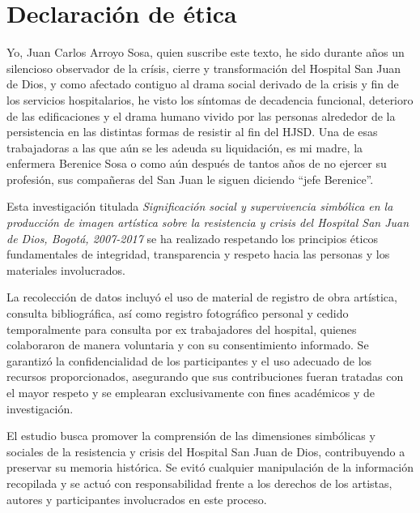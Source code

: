 \section*{Declaración de ética}
\setlength{\parskip}{1em}

\textcolor{edit30sept}{Yo, Juan Carlos Arroyo Sosa, quien suscribe este texto,} he sido durante años un silencioso observador \textcolor{edit30sept}{de la crísis, cierre y transformación del Hospital San Juan de Dios}, y como afectado contiguo al drama social derivado de la crisis y fin de los servicios hospitalarios, he visto los síntomas de decadencia funcional, deterioro de las edificaciones y el drama humano vivido por las personas alrededor de la persistencia en las distintas formas de resistir al fin del HJSD. Una de esas trabajadoras a las que aún se les adeuda su liquidación, es mi madre, la enfermera Berenice Sosa o como aún después de tantos años de no ejercer su profesión, sus compañeras del San Juan le siguen diciendo “jefe Berenice”.

Esta investigación titulada \textit{Significación social y supervivencia simbólica en la producción de imagen artística sobre la resistencia y crisis del Hospital San Juan de Dios, Bogotá, 2007-2017} se ha realizado respetando los principios éticos fundamentales de integridad, transparencia y respeto hacia las personas y los materiales involucrados.  

La recolección de datos incluyó el uso de material de registro de obra artística, consulta bibliográfica, así como registro fotográfico personal y cedido temporalmente para consulta por ex trabajadores del hospital, quienes colaboraron de manera voluntaria y con su consentimiento informado. Se garantizó la confidencialidad de los participantes y el uso adecuado de los recursos proporcionados, asegurando que sus contribuciones fueran tratadas con el mayor respeto y se emplearan exclusivamente con fines académicos y de investigación.  

El estudio busca promover la comprensión de las dimensiones simbólicas y sociales de la resistencia y crisis del Hospital San Juan de Dios, contribuyendo a preservar su memoria histórica. Se evitó cualquier manipulación de la información recopilada y se actuó con responsabilidad frente a los derechos de los artistas, autores y participantes involucrados en este proceso.  

\pagebreak